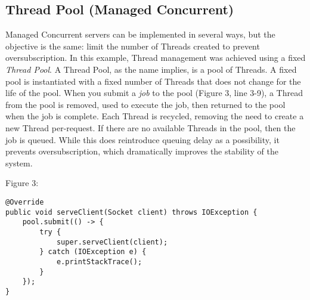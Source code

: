 \subsection{Thread Pool (Managed Concurrent)}

Managed Concurrent servers can be implemented in several ways, but the objective is the same: limit the number of Threads created to prevent oversubscription. 
In this example, Thread management was achieved using a fixed \textit{Thread Pool}.
A Thread Pool, as the name implies, is a pool of Threads. 
A fixed pool is instantiated with a fixed number of Threads that does not change for the life of the pool.
When you submit a \textit{job} to the pool (Figure 3, line 3-9), a Thread from the pool is removed, used to execute the job, then returned to the pool when the job is complete. 
Each Thread is recycled, removing the need to create a new Thread per-request.
If there are no available Threads in the pool, then the job is queued. 
While this does reintroduce queuing delay as a possibility, it prevents oversubscription, which dramatically improves the stability of the system.

Figure 3:
\begin{lstlisting}
@Override
public void serveClient(Socket client) throws IOException {
	pool.submit(() -> {
		try {
			super.serveClient(client);
		} catch (IOException e) {
			e.printStackTrace();
		}
	});
}
\end{lstlisting} 